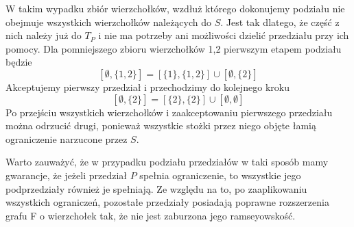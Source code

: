 W takim wypadku zbiór wierzchołków, wzdłuż którego dokonujemy podziału nie obejmuje wszystkich wierzchołków należących do $S$. Jest tak dlatego, że część z nich należy już do $T_P$ i nie ma potrzeby ani możliwości dzielić przedziału przy ich pomocy. Dla pomniejszego zbioru wierzchołków {1,2} pierwszym etapem podziału będzie 
$$[{\emptyset},\{1,2\}]= [\{1\},\{1,2\}] \cup [{\emptyset},\{2\}]$$ Akceptujemy pierwszy przedział i przechodzimy do kolejnego kroku
$$ [{\emptyset},\{2\}]= [\{2\},\{2\}] \cup [{\emptyset},{\emptyset}]$$ Po przejściu wszystkich wierzchołków i zaakceptowaniu pierwszego przedziału można odrzucić drugi, ponieważ wszystkie stożki przez niego objęte łamią ograniczenie narzucone przez $S$.

Warto zauważyć, że w przypadku podziału przedziałów w taki sposób mamy gwarancje, że jeżeli przedział $P$ spełnia ograniczenie, to wszystkie jego podprzedziały również je spełniają. Ze względu na to, po zaaplikowaniu wszystkich ograniczeń, pozostałe przedziały posiadają poprawne rozszerzenia grafu F o wierzchołek tak, że nie jest zaburzona jego ramseyowskość. 
